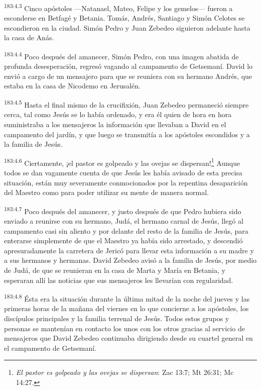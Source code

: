 \par
\textsuperscript{183:4.3} Cinco apóstoles ---Natanael, Mateo, Felipe y los gemelos--- fueron a esconderse en Betfagé y Betania. Tomás, Andrés, Santiago y Simón Celotes se escondieron en la ciudad. Simón Pedro y Juan Zebedeo siguieron adelante hasta la casa de Anás.

\par
\textsuperscript{183:4.4} Poco después del amanecer, Simón Pedro, con una imagen abatida de profunda desesperación, regresó vagando al campamento de Getsemaní. David lo envió a cargo de un mensajero para que se reuniera con su hermano Andrés, que estaba en la casa de Nicodemo en Jerusalén.

\par
\textsuperscript{183:4.5} Hasta el final mismo de la crucifixión, Juan Zebedeo permaneció siempre cerca, tal como Jesús se lo había ordenado, y era él quien de hora en hora suministraba a los mensajeros la información que llevaban a David en el campamento del jardín, y que luego se transmitía a los apóstoles escondidos y a la familia de Jesús.

\par
\textsuperscript{183:4.6} Ciertamente, ¡el pastor es golpeado y las ovejas se dispersan!\footnote{\textit{El pastor es golpeado y las ovejas se dispersan}: Zac 13:7; Mt 26:31; Mc 14:27.} Aunque todos se dan vagamente cuenta de que Jesús les había avisado de esta precisa situación, están muy severamente conmocionados por la repentina desaparición del Maestro como para poder utilizar su mente de manera normal.

\par
\textsuperscript{183:4.7} Poco después del amanecer, y justo después de que Pedro hubiera sido enviado a reunirse con su hermano, Judá, el hermano carnal de Jesús, llegó al campamento casi sin aliento y por delante del resto de la familia de Jesús, para enterarse simplemente de que el Maestro ya había sido arrestado, y descendió apresuradamente la carretera de Jericó para llevar esta información a su madre y a sus hermanos y hermanas. David Zebedeo avisó a la familia de Jesús, por medio de Judá, de que se reunieran en la casa de Marta y María en Betania, y esperaran allí las noticias que sus mensajeros les llevarían con regularidad.

\par
\textsuperscript{183:4.8} Ésta era la situación durante la última mitad de la noche del jueves y las primeras horas de la mañana del viernes en lo que concierne a los apóstoles, los discípulos principales y la familia terrenal de Jesús. Todos estos grupos y personas se mantenían en contacto los unos con los otros gracias al servicio de mensajeros que David Zebedeo continuaba dirigiendo desde su cuartel general en el campamento de Getsemaní.

